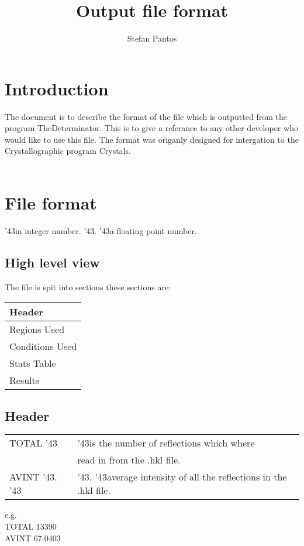 \documentclass[11pt]{article}
\title{Output file format}
\author{Stefan Pantos}
\newcommand{\hash}{\char '43} %
\begin{document}
\maketitle
\section{Introduction}
The document is to describe the format of the file which is outputted from the program TheDeterminator. This is to give a referance to any other developer who would like to use this file. The format was origanly designed for intergation to the Crystallographic program Crystals.\\\\
\section{File format}
\small{\hash in integer number. \hash . \hash a floating point number.}
\subsection{High level view}
The file is spit into sections these sections are:\\
\begin{table}[h]
\begin{tabular}{|l|}\hline
Header\\
\hline
Regions Used\\
\hline
Conditions Used\\
\hline
Stats Table\\
\hline
Results\\
\hline
\end{tabular}
\end{table}
\subsection{Header}
\begin{table}[h]
\begin{tabular}{|l|l|}\hline
TOTAL \hash & \hash  is the number of reflections which where\\
		&	read in from the .hkl file.\\
\hline
AVINT \hash . \hash & \hash . \hash average intensity of all the reflections in the .hkl file.\\
\hline
\end{tabular}
\end{table}
e.g.\\
TOTAL 13390\\
AVINT 67.0403
\end{document}
